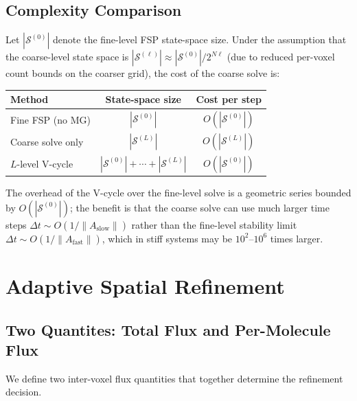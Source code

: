 \documentclass[review,onefignum,onetabnum]{siamart171218}
\newcommand{\calS}{\mathcal{S}}
\newcommand{\norm}[1]{\left\|#1\right\|}
\begin{document}
\subsection{Complexity Comparison}

Let $|\calS^{(0)}|$ denote the fine-level FSP state-space size.
Under the assumption that the coarse-level state space is
$|\calS^{(\ell)}| \approx |\calS^{(0)}| / 2^{N \ell}$ (due to
reduced per-voxel count bounds on the coarser grid), the cost of
the coarse solve is:

\begin{center}
\begin{tabular}{lcc}
  \hline
  Method & State-space size & Cost per step \\
  \hline
  Fine FSP (no MG) & $|\calS^{(0)}|$ & $O(|\calS^{(0)}|)$ \\
  Coarse solve only & $|\calS^{(L)}|$ & $O(|\calS^{(L)}|)$ \\
  $L$-level V-cycle & $|\calS^{(0)}| + \cdots + |\calS^{(L)}|$
    & $O(|\calS^{(0)}|)$ \\
  \hline
\end{tabular}
\end{center}

The overhead of the V-cycle over the fine-level solve is a
geometric series bounded by $O(|\calS^{(0)}|)$; the benefit is
that the coarse solve can use much larger time steps
$\Delta t \sim O(1/\norm{A_{\mathrm{slow}}})$ rather than the
fine-level stability limit $\Delta t \sim O(1/\norm{A_{\mathrm{fast}}})$,
which in stiff systems may be $10^2$--$10^6$ times larger.

\section{Adaptive Spatial Refinement}
\label{sec:adaptive}

\subsection{Two Quantites: Total Flux and Per-Molecule Flux}

We define two inter-voxel flux quantities that together determine
the refinement decision.
\end{document}
